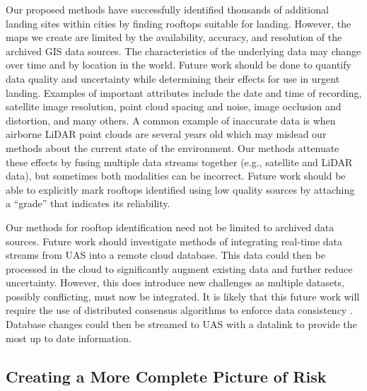 Our proposed methods have successfully identified thousands of additional landing sites within cities by finding rooftops suitable for landing. However, the maps we create are limited by the availability, accuracy, and resolution of the archived \ac{GIS} data sources. The characteristics of the underlying data may change over time and by location in the world. Future work should be done to quantify data quality and uncertainty while determining their effects for use in urgent landing. Examples of important attributes include the date and time of recording, satellite image resolution, point cloud spacing and noise, image occlusion and distortion, and many others. A common example of inaccurate data is when airborne LiDAR point clouds are several years old which may mislead our methods about the current state of the environment. Our methods attenuate these effects by fusing multiple data streams together (e.g., satellite and LiDAR data), but sometimes both modalities can be incorrect. Future work should be able to explicitly mark rooftops identified using low quality sources by attaching a ``grade'' that indicates its reliability.

Our methods for rooftop identification need not be limited to archived data sources. Future work should investigate methods of integrating real-time data streams from UAS into a remote cloud database. This data could then be processed in the cloud to significantly augment existing data and further reduce uncertainty. However, this does introduce new challenges as multiple datasets, possibly conflicting, must now be integrated. It is likely that this future work will require the use of distributed consensus algorithms to enforce data consistency \cite{raft_concensus}. Database changes could then be streamed to UAS with a datalink to provide the most up to date information.

\subsection{Creating a More Complete Picture of Risk}

